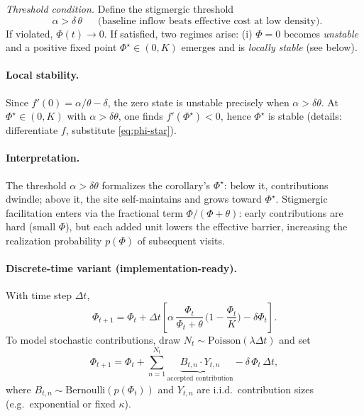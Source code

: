 \documentclass{article}
\begin{document}
\emph{Threshold condition.} Define the stigmergic threshold
\[
\boxed{\;\;\alpha > \delta\,\theta\;\;}
\quad\text{(baseline inflow beats effective cost at low density).}
\]
If violated, $\Phi(t)\to 0$. If satisfied, two regimes arise:
(i) $\Phi=0$ becomes \emph{unstable} and a positive fixed point
$\Phi^\star\in(0,K)$ emerges and is \emph{locally stable} (see below).

\paragraph{Local stability.}
Since $f'(0)= \alpha/ \theta - \delta$, the zero state is unstable precisely when $\alpha>\delta\theta$.
At $\Phi^\star\in(0,K)$ with $\alpha>\delta\theta$, one finds $f'(\Phi^\star)<0$, hence
$\Phi^\star$ is stable (details: differentiate $f$, substitute \eqref{eq:phi-star}).

\paragraph{Interpretation.}
The threshold $\alpha>\delta\theta$ formalizes the corollary’s $\Phi^\star$:
below it, contributions dwindle; above it, the site self-maintains and grows toward $\Phi^\star$.
Stigmergic facilitation enters via the fractional term $\Phi/(\Phi+\theta)$: early contributions
are hard (small $\Phi$), but each added unit lowers the effective barrier, increasing the
realization probability $p(\Phi)$ of subsequent visits.

\paragraph{Discrete-time variant (implementation-ready).}
With time step $\Delta t$,
\[
\Phi_{t+1}
= \Phi_t
+ \Delta t \left[\alpha\,\frac{\Phi_t}{\Phi_t+\theta}\,\Big(1-\frac{\Phi_t}{K}\Big) - \delta \Phi_t\right].
\]
To model stochastic contributions, draw $N_t \sim \mathrm{Poisson}(\lambda \Delta t)$ and set
\[
\Phi_{t+1} = \Phi_t + \sum_{n=1}^{N_t} \underbrace{B_{t,n} \cdot Y_{t,n}}_{\text{accepted contribution}} - \delta\,\Phi_t\,\Delta t,
\]
where $B_{t,n}\sim \mathrm{Bernoulli}(p(\Phi_t))$ and $Y_{t,n}$ are i.i.d.\ contribution sizes
(e.g.\ exponential or fixed $\kappa$).
\end{document}
